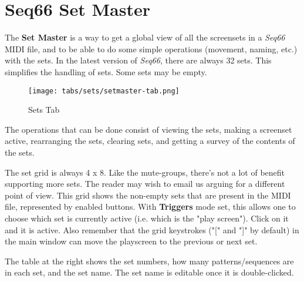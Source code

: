 %
%
%

\section{Seq66 Set Master}
\label{sec:setmaster}

   The \textbf{Set Master} is a way to get a global view of all the screensets
   in a \textsl{Seq66} MIDI file, and to be able to do some simple operations
   (movement, naming, etc.) with the sets.
   In the latest version of \textsl{Seq66}, there are always 32 sets.
   This simplifies the handling of sets.
   Some sets may be empty.

\begin{figure}[H]
   \centering 
   \texttt{[image: tabs/sets/setmaster-tab.png]}
   \caption{Sets Tab}
   \label{fig:setmaster_tab}
\end{figure}

   The operations that can be done consist of viewing the sets, making a
   screenset active, rearranging the sets, clearing sets, and getting a survey
   of the contents of the sets.

   \setcounter{ItemCounter}{0}      %

   The set grid is always 4 x 8.  Like the mute-groups, there's not
   a lot of benefit supporting more sets.  The reader may wish to email us
   arguing for a different point of view.
   This grid shows the non-empty sets that are present in the MIDI file,
   represented by enabled buttons.
   With \textbf{Triggers} mode set, this  allows one to choose which set
   is currently
   active (i.e. which is the "play screen").
   Click on it and it is active.
   Also remember that the grid
   keystrokes ("[" and "]" by default)
   in the main window can move the playscreen to the previous or next set.
 
   The table at the right shows the set numbers, how many patterns/sequences
   are in each set, and the set name.  The set name is editable once it is
   double-clicked.

